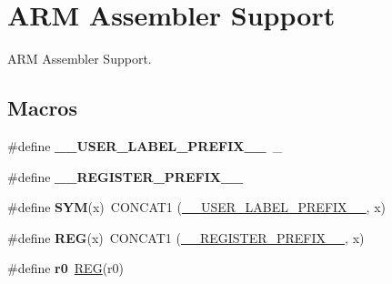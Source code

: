\hypertarget{group__RTEMSScoreCPUARMASM}{}\section{A\+RM Assembler Support}
\label{group__RTEMSScoreCPUARMASM}


A\+RM Assembler Support.  


\subsection*{Macros}
\begin{DoxyCompactItemize}
\item 
\mbox{\label{group__RTEMSScoreCPUARMASM_gaff6bf0ff0fa3b5cbd23a8ae1131c87a9}} 
\#define {\bfseries \+\_\+\+\_\+\+U\+S\+E\+R\+\_\+\+L\+A\+B\+E\+L\+\_\+\+P\+R\+E\+F\+I\+X\+\_\+\+\_\+}~\+\_\+
\item 
\mbox{\label{group__RTEMSScoreCPUARMASM_ga08d4062230ffc8494f4be4f6447497e4}} 
\#define {\bfseries \+\_\+\+\_\+\+R\+E\+G\+I\+S\+T\+E\+R\+\_\+\+P\+R\+E\+F\+I\+X\+\_\+\+\_\+}
\item 
\mbox{\label{group__RTEMSScoreCPUARMASM_gafe05d428a5f345f51fb591debb815325}} 
\#define {\bfseries S\+YM}(x)~C\+O\+N\+C\+A\+T1 (\mbox{\hyperlink{group__RTEMSScoreCPUx86-64ASM_gaff6bf0ff0fa3b5cbd23a8ae1131c87a9}{\+\_\+\+\_\+\+U\+S\+E\+R\+\_\+\+L\+A\+B\+E\+L\+\_\+\+P\+R\+E\+F\+I\+X\+\_\+\+\_\+}}, x)
\item 
\mbox{\label{group__RTEMSScoreCPUARMASM_gacee196421e9a06f7700bb3064b13b37a}} 
\#define {\bfseries R\+EG}(x)~C\+O\+N\+C\+A\+T1 (\mbox{\hyperlink{group__RTEMSScoreCPUV850ASM_ga08d4062230ffc8494f4be4f6447497e4}{\+\_\+\+\_\+\+R\+E\+G\+I\+S\+T\+E\+R\+\_\+\+P\+R\+E\+F\+I\+X\+\_\+\+\_\+}}, x)
\item 
\mbox{\label{group__RTEMSScoreCPUARMASM_gaf8ef4632fb5325a43f9c31778135d450}} 
\#define {\bfseries r0}~\mbox{\hyperlink{group__RTEMSScoreCPUx86-64ASM_gacee196421e9a06f7700bb3064b13b37a}{R\+EG}}(r0)
\item 
\mbox{\label{group__RTEMSScoreCPUARMASM_ga7eaf5903abe583c64f4324081140b84e}} 

\end{DoxyCompactItemize}
